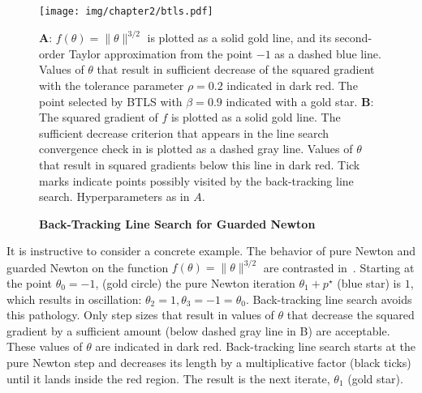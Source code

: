 \documentclass[../../thesis.tex]{subfiles}
\begin{document}
\begin{figure}[Hp!]
	\begin{center}
		\texttt{[image: img/chapter2/btls.pdf]}
	\end{center}
	\caption{\textbf{Back-Tracking Line Search
	for Guarded Newton}}{%
	\textbf{A}:
	$f(\theta) = \|\theta\|^{3/2}$
	is plotted as a solid gold line,
	and its second-order Taylor approximation
	from the point $-1$ as a dashed blue line.
	Values of $\theta$ that result in
	sufficient decrease of the squared gradient
	with the tolerance parameter $\rho=0.2$
	indicated in dark red.
	The point selected by BTLS
	with $\beta=0.9$ indicated with a gold star.
	\textbf{B}:
	The squared gradient of $f$ is plotted as a
	solid gold line.
	The sufficient decrease criterion that appears
	in the line search convergence check in 
	is plotted as a dashed gray line.
	Values of $\theta$ that result in squared gradients
	below this line in dark red.
	Tick marks indicate points possibly visited
	by the back-tracking line search.
	Hyperparameters as in $A$.
	}
\end{figure}

It is instructive to consider a concrete example.
The behavior of pure Newton and
guarded Newton on the function
$f(\theta) = \|\theta\|^{3/2}$
are contrasted in~.
Starting at the point $\theta_0=-1$,
(gold circle)
the pure Newton iteration $\theta_1 + p^\star$
(blue star)
is $1$, which results in oscillation:
$\theta_2=1, \theta_3=-1=\theta_0$.
Back-tracking line search avoids this pathology.
Only step sizes that result in values of $\theta$
that decrease the squared gradient by a sufficient amount
(below dashed gray line in B)
are acceptable.
These values of $\theta$ are indicated in dark red.
Back-tracking line search starts at the pure Newton step
and decreases its length by a multiplicative factor
(black ticks)
until it lands inside the red region.
The result is the next iterate,
$\theta_1$ (gold star).
\end{document}
